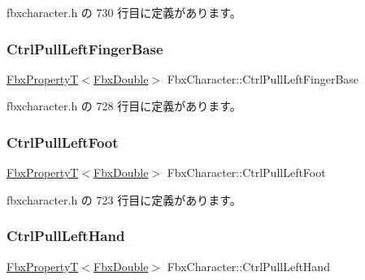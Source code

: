  fbxcharacter.\+h の 730 行目に定義があります。

\mbox{\label{class_fbx_character_af2b72f5ec76ccfca0a59cba911ee42cd}} 
\subsubsection{\texorpdfstring{Ctrl\+Pull\+Left\+Finger\+Base}{CtrlPullLeftFingerBase}}
{\footnotesize\ttfamily \hyperlink{class_fbx_property_t}{Fbx\+PropertyT}$<$\hyperlink{fbxtypes_8h_a171e72a1c46fc15c1a6c9c31948c1c5b}{Fbx\+Double}$>$ Fbx\+Character\+::\+Ctrl\+Pull\+Left\+Finger\+Base}



 fbxcharacter.\+h の 728 行目に定義があります。

\mbox{\label{class_fbx_character_a9db7ae7ce8136715096e1e561340a90f}} 
\subsubsection{\texorpdfstring{Ctrl\+Pull\+Left\+Foot}{CtrlPullLeftFoot}}
{\footnotesize\ttfamily \hyperlink{class_fbx_property_t}{Fbx\+PropertyT}$<$\hyperlink{fbxtypes_8h_a171e72a1c46fc15c1a6c9c31948c1c5b}{Fbx\+Double}$>$ Fbx\+Character\+::\+Ctrl\+Pull\+Left\+Foot}



 fbxcharacter.\+h の 723 行目に定義があります。

\mbox{\label{class_fbx_character_a7d7dd16a8fffa5e2c277f8ec952bba6d}} 
\subsubsection{\texorpdfstring{Ctrl\+Pull\+Left\+Hand}{CtrlPullLeftHand}}
{\footnotesize\ttfamily \hyperlink{class_fbx_property_t}{Fbx\+PropertyT}$<$\hyperlink{fbxtypes_8h_a171e72a1c46fc15c1a6c9c31948c1c5b}{Fbx\+Double}$>$ Fbx\+Character\+::\+Ctrl\+Pull\+Left\+Hand}



